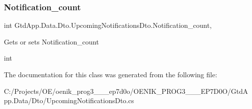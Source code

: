 \subsubsection{\texorpdfstring{Notification\+\_\+count}{Notification\_count}}
{\footnotesize\ttfamily int Gtd\+App.\+Data.\+Dto.\+Upcoming\+Notifications\+Dto.\+Notification\+\_\+count\hspace{0.3cm}{\ttfamily [get]}, {\ttfamily [set]}}



Gets or sets Notification\+\_\+count 

int

The documentation for this class was generated from the following file\+:\begin{DoxyCompactItemize}
\item 
C\+:/\+Projects/\+O\+E/oenik\+\_\+prog3\+\_\+\_\+\_\+ep7d0o/\+O\+E\+N\+I\+K\+\_\+\+P\+R\+O\+G3\+\_\+\_\+\_\+\+E\+P7\+D0\+O/\+Gtd\+App.\+Data/\+Dto/Upcoming\+Notifications\+Dto.\+cs\end{DoxyCompactItemize}
